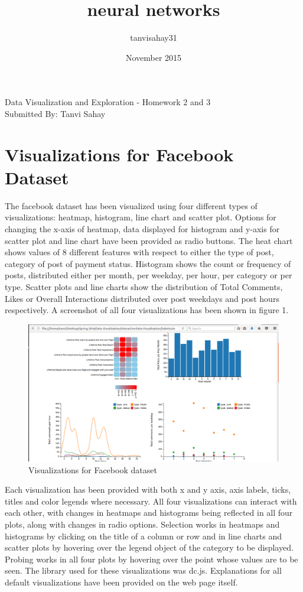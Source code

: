 \documentclass{article}
\title{neural networks}
\author{tanvisahay31 }
\date{November 2015}
\begin{document}
\vspace{0.5em}
\begin{center}
\large{Data Visualization and Exploration - Homework 2 and 3}\\
\vspace{0.6em}
\large{Submitted By: Tanvi Sahay}
\end{center}
\vspace{0.5em}
\noindent
\section*{Visualizations for Facebook Dataset}
The facebook dataset has been visualized using four different types of visualizations: heatmap, histogram, line chart and scatter plot. Options for changing the x-axis of heatmap, data displayed for histogram and y-axis for scatter plot and line chart have been provided as radio buttons. The heat chart shows values of 8 different features with respect to either the type of post, category of post of payment status. Histogram shows the count or frequency of posts, distributed either per month, per weekday, per hour, per category or per type. Scatter plots and line charts show the distribution of Total Comments, Likes or Overall Interactions distributed over post weekdays and post hours respectively. A screenshot of all four visualizations has been shown in figure 1. 

\begin{figure}[h]
\centering
\includegraphics[scale=0.3]{fb_all.png}
\caption{Visualizations for Facebook dataset}
\end{figure} 

\noindent
Each visualization has been provided with both x and y axis, axis labels, ticks, titles and color legends where necessary. All four visualizations can interact with each other, with changes in heatmaps and histograms being reflected in all four plots, along with changes in radio options. Selection works in heatmaps and histograms by clicking on the title of a column or row and in line charts and scatter plots by hovering over the legend object of the category to be displayed. Probing works in all four plots by hovering over the point whose values are to be seen. The library used for these visualizations was dc.js. Explanations for all default visualizations have been provided on the web page itself. 
\end{document}

